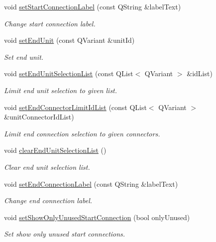 \begin{DoxyCompactItemize}
void \hyperlink{classmdt_cl_unit_link_dialog_af3247e29241f9d3f752adaf5ae6b4ac7}{set\-Start\-Connection\-Label} (const Q\-String \&label\-Text)
\begin{DoxyCompactList}\small\item\em Change start connection label. \end{DoxyCompactList}\item 
void \hyperlink{classmdt_cl_unit_link_dialog_a53c0fc3dd8a4134acd185d91e92f0f83}{set\-End\-Unit} (const Q\-Variant \&unit\-Id)
\begin{DoxyCompactList}\small\item\em Set end unit. \end{DoxyCompactList}\item 
void \hyperlink{classmdt_cl_unit_link_dialog_af4df48ddbeffce27bc9479ed36eb467a}{set\-End\-Unit\-Selection\-List} (const Q\-List$<$ Q\-Variant $>$ \&id\-List)
\begin{DoxyCompactList}\small\item\em Limit end unit selection to given list. \end{DoxyCompactList}\item 
void \hyperlink{classmdt_cl_unit_link_dialog_a8b49ddb18fdbd2fc98dbea32ef45f131}{set\-End\-Connector\-Limit\-Id\-List} (const Q\-List$<$ Q\-Variant $>$ \&unit\-Connector\-Id\-List)
\begin{DoxyCompactList}\small\item\em Limit end connection selection to given connectors. \end{DoxyCompactList}\item 
void \hyperlink{classmdt_cl_unit_link_dialog_ac27cc9700c46dc37f810ddedcf843548}{clear\-End\-Unit\-Selection\-List} ()
\begin{DoxyCompactList}\small\item\em Clear end unit selection list. \end{DoxyCompactList}\item 
void \hyperlink{classmdt_cl_unit_link_dialog_a7900da45f938cb4889d561e95928c8aa}{set\-End\-Connection\-Label} (const Q\-String \&label\-Text)
\begin{DoxyCompactList}\small\item\em Change end connection label. \end{DoxyCompactList}\item 
void \hyperlink{classmdt_cl_unit_link_dialog_a14665de1075d3a309584ceff17c26f0c}{set\-Show\-Only\-Unused\-Start\-Connection} (bool only\-Unused)
\begin{DoxyCompactList}\small\item\em Set show only unused start connections. \end{DoxyCompactList}\item 

\end{DoxyCompactItemize}
